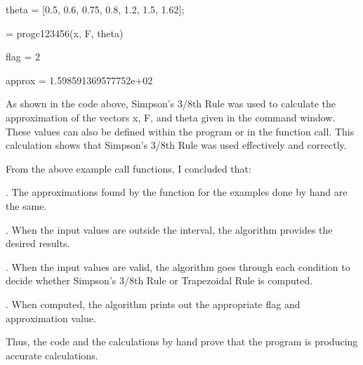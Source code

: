 \documentclass{article}
\begin{document}
{theta = [0.5, 0.6, 0.75, 0.8, 1.2, 1.5, 1.62];
\par {} = progc123456(x, F, theta)
\par \medskip
flag = 2
\par \medskip
approx = 1.598591369577752e+02
\par \medskip
\par \medskip
As shown in the code above, Simpson’s 3/8th Rule was used to calculate the approximation of the vectors x, F, and theta given in the command window.  These values can also be defined within the program or in the function call.  This calculation shows that Simpson’s 3/8th Rule was used effectively and correctly.
\par \medskip
From the above example call functions, I concluded that:
\par {}. The approximations found by the function for the examples done by hand are the same.
\par {}.  When the input values are outside the interval, the algorithm provides the desired results.
\par {}. When the input values are valid, the algorithm goes through each condition to decide whether Simpson’s 3/8th Rule or Trapezoidal Rule is computed.
\par {}.  When computed, the algorithm prints out the appropriate flag and approximation value.
\par \medskip
Thus, the code and the calculations by hand prove that the program is producing accurate calculations.

}




\end{document}
